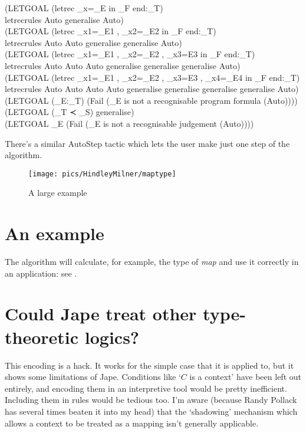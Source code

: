 \begin{japeish}
\tab \tab (LETGOAL (letrec \_x=\_E in \_F end:\_T)  \\
\tab \tab \tab letrecrules Auto generalise Auto) \\
\tab \tab (LETGOAL (letrec \_x1=\_E1 , \_x2=\_E2 in \_F end:\_T) \\ 
\tab \tab \tab letrecrules Auto Auto generalise generalise Auto) \\
\tab \tab (LETGOAL (letrec \_x1=\_E1 , \_x2=\_E2 , \_x3=E3 in \_F end:\_T)  \\
\tab \tab \tab letrecrules Auto Auto Auto generalise generalise generalise Auto) \\
\tab \tab (LETGOAL (letrec \_x1=\_E1 , \_x2=\_E2 , \_x3=E3 , \_x4=\_E4 in \_F end:\_T)  \\
\tab \tab \tab letrecrules Auto Auto Auto Auto generalise generalise generalise generalise Auto) \\
\tab \tab (LETGOAL (\_E:\_T) (Fail (\_E is not a recognisable program formula (Auto)))) \\
\tab \tab (LETGOAL (\_T ≺ \_S) generalise) \\
\tab \tab (LETGOAL \_E (Fail (\_E is not a recognisable judgement (Auto)))) \\
\end{japeish}

There's a similar AutoStep tactic which lets the user make just one step of the algorithm.

\begin{figure}
\centering
\texttt{[image: pics/HindleyMilner/maptype]}
\caption{A large example}
\label{fig:HindleyMilner:maptype}
\end{figure}

\section{An example}

The algorithm will calculate, for example, the type of \textit{map} and use it correctly in an application: see .

\section{Could Jape treat other type-theoretic logics?}

This encoding is a hack. It works for the simple case that it is applied to, but it shows some limitations of Jape. Conditions like `$C$ is a context' have been left out entirely, and encoding them in an interpretive tool would be pretty inefficient. Including them in rules would be tedious too. I'm aware (because Randy Pollack has several times beaten it into my head) that the `shadowing' mechanism which allows a context to be treated as a mapping isn't generally applicable.

